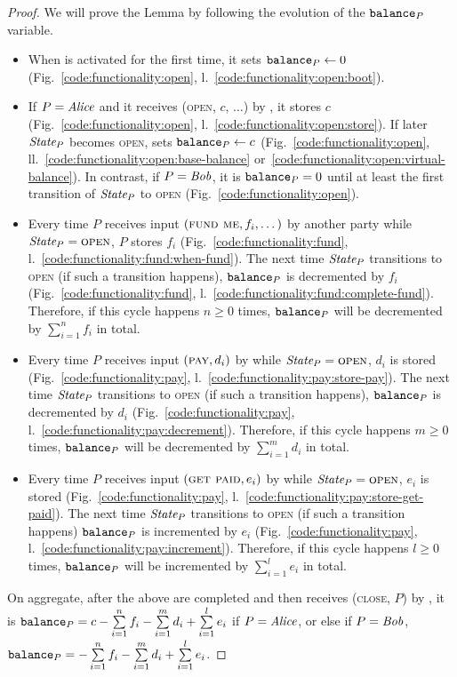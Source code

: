 \begin{proof}
  We will prove the Lemma by following the evolution of the $\texttt{balance}_{P}$
  variable.
  \begin{itemize}
    \item When \fchan is activated for the first time, it sets $\texttt{balance}_{P}
    \gets 0$ (Fig.~\ref{code:functionality:open},
    l.~\ref{code:functionality:open:boot}). \item If $P = \mathit{Alice}$ and it
    receives (\textsc{open}, $c$, $\dots$) by \environment, it stores $c$
    (Fig.~\ref{code:functionality:open},
    l.~\ref{code:functionality:open:store}). If later $\itistate_P$ becomes
    \textsc{open}, \fchan sets $\texttt{balance}_{P} \gets c$
    (Fig.~\ref{code:functionality:open},
    ll.~\ref{code:functionality:open:base-balance}
    or~\ref{code:functionality:open:virtual-balance}). In contrast, if $P =
    \mathit{Bob}$, it is $\texttt{balance}_{P} = 0$ until at least the first transition of
    $\itistate_P$ to \textsc{open} (Fig.~\ref{code:functionality:open}).
    \item Every time $P$ receives input $(\textsc{fund me}, f_i, \dots)$ by
    another party while $\itistate_P = \textsc{open}$, $P$ stores $f_i$
    (Fig.~\ref{code:functionality:fund},
    l.~\ref{code:functionality:fund:when-fund}). The next time $\itistate_P$
    transitions to \textsc{open} (if such a transition happens), $\texttt{balance}_{P}$
    is decremented by $f_i$ (Fig.~\ref{code:functionality:fund},
    l.~\ref{code:functionality:fund:complete-fund}). Therefore, if this cycle
    happens $n \geq 0$ times, $\texttt{balance}_{P}$ will be decremented by
    $\sum\limits_{i=1}^n f_i$ in total.
    \item Every time $P$ receives input $(\textsc{pay}, d_i)$ by \environment
    while $\itistate_P = \textsc{open}$, $d_i$ is stored
    (Fig.~\ref{code:functionality:pay},
    l.~\ref{code:functionality:pay:store-pay}). The next time
    $\itistate_P$ transitions to \textsc{open} (if such a transition happens),
    $\texttt{balance}_{P}$ is decremented by $d_i$
    (Fig.~\ref{code:functionality:pay},
    l.~\ref{code:functionality:pay:decrement}). Therefore, if this cycle
    happens $m \geq 0$ times, $\texttt{balance}_{P}$ will be decremented by
    $\sum\limits_{i=1}^m d_i$ in total.
    \item Every time $P$ receives input $(\textsc{get paid}, e_i)$ by
    \environment while $\itistate_P = \textsc{open}$, $e_i$ is stored
    (Fig.~\ref{code:functionality:pay},
    l.~\ref{code:functionality:pay:store-get-paid}). The next time
    $\itistate_P$ transitions to \textsc{open} (if such a transition happens)
    $\texttt{balance}_{P}$ is incremented by $e_i$
    (Fig.~\ref{code:functionality:pay},
    l.~\ref{code:functionality:pay:increment}). Therefore, if this cycle
    happens $l \geq 0$ times, $\texttt{balance}_{P}$ will be incremented by
    $\sum\limits_{i=1}^l e_i$ in total.
  \end{itemize}
  On aggregate, after the above are completed and then \fchan receives
  (\textsc{close}, $P$) by \simulator, it is $\texttt{balance}_{P} = c -
  \sum\limits_{i=1}^n f_i - \sum\limits_{i=1}^m d_i + \sum\limits_{i=1}^l e_i$
  if $P = \mathit{Alice}$, or else if $P = \mathit{Bob}$, $\texttt{balance}_{P} = - \sum\limits_{i=1}^n
  f_i - \sum\limits_{i=1}^m d_i + \sum\limits_{i=1}^l e_i$.
\end{proof}
